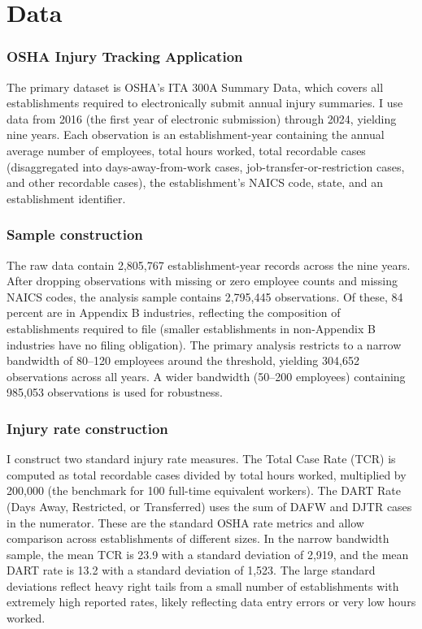 \documentclass[12pt]{article}
\begin{document}
\section{Data}\label{sec:data}

\subsubsection*{OSHA Injury Tracking Application} The primary dataset is OSHA's ITA 300A Summary Data, which covers all establishments required to electronically submit annual injury summaries. I use data from 2016 (the first year of electronic submission) through 2024, yielding nine years. Each observation is an establishment-year containing the annual average number of employees, total hours worked, total recordable cases (disaggregated into days-away-from-work cases, job-transfer-or-restriction cases, and other recordable cases), the establishment's NAICS code, state, and an establishment identifier.

\subsubsection*{Sample construction} The raw data contain 2,805,767 establishment-year records across the nine years. After dropping observations with missing or zero employee counts and missing NAICS codes, the analysis sample contains 2,795,445 observations. Of these, 84 percent are in Appendix B industries, reflecting the composition of establishments required to file (smaller establishments in non-Appendix B industries have no filing obligation). The primary analysis restricts to a narrow bandwidth of 80--120 employees around the threshold, yielding 304,652 observations across all years. A wider bandwidth (50--200 employees) containing 985,053 observations is used for robustness.

\subsubsection*{Injury rate construction} I construct two standard injury rate measures. The Total Case Rate (TCR) is computed as total recordable cases divided by total hours worked, multiplied by 200,000 (the benchmark for 100 full-time equivalent workers). The DART Rate (Days Away, Restricted, or Transferred) uses the sum of DAFW and DJTR cases in the numerator. These are the standard OSHA rate metrics and allow comparison across establishments of different sizes. In the narrow bandwidth sample, the mean TCR is 23.9 with a standard deviation of 2,919, and the mean DART rate is 13.2 with a standard deviation of 1,523. The large standard deviations reflect heavy right tails from a small number of establishments with extremely high reported rates, likely reflecting data entry errors or very low hours worked.
\end{document}
